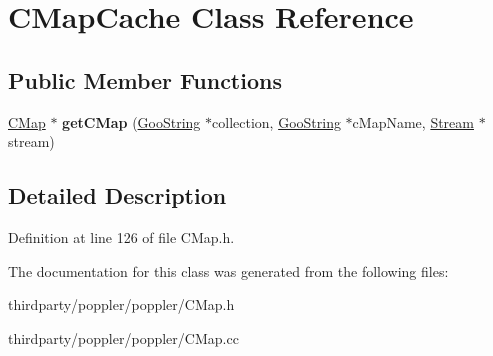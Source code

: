 \hypertarget{class_c_map_cache}{}\section{C\+Map\+Cache Class Reference}
\label{class_c_map_cache}
\subsection*{Public Member Functions}
\begin{DoxyCompactItemize}
\item 
\mbox{\label{class_c_map_cache_ab10dcc7f989edd42a6d1fb024b0d2d11}} 
\hyperlink{class_c_map}{C\+Map} $\ast$ {\bfseries get\+C\+Map} (\hyperlink{class_goo_string}{Goo\+String} $\ast$collection, \hyperlink{class_goo_string}{Goo\+String} $\ast$c\+Map\+Name, \hyperlink{class_stream}{Stream} $\ast$stream)
\end{DoxyCompactItemize}


\subsection{Detailed Description}


Definition at line 126 of file C\+Map.\+h.



The documentation for this class was generated from the following files\+:\begin{DoxyCompactItemize}
\item 
thirdparty/poppler/poppler/C\+Map.\+h\item 
thirdparty/poppler/poppler/C\+Map.\+cc\end{DoxyCompactItemize}
